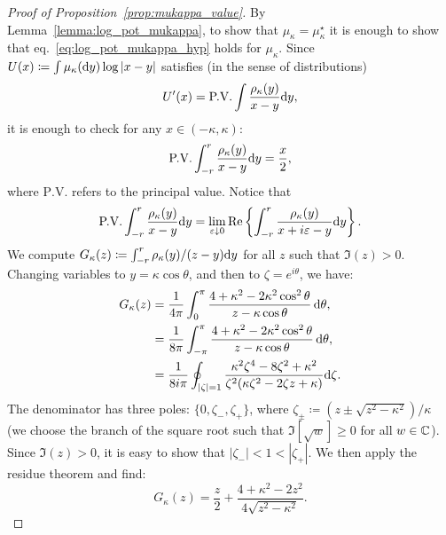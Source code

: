 \begin{proof}[Proof of Proposition~\ref{prop:mukappa_value}] 
    By Lemma~\ref{lemma:log_pot_mukappa}, to show that $\mu_\kappa = \mu_\kappa^\star$ it is enough to show that eq.~\eqref{eq:log_pot_mukappa_hyp} 
    holds for $\mu_\kappa$. 
    Since $U(x) \coloneqq \int \mu_\kappa(\mathrm{d} y) \log |x-y|$ satisfies (in the sense of distributions)
    \begin{equation*}
        U'(x) = \textrm{P.V.} \int \frac{\rho_\kappa(y)}{x-y} \mathrm{d} y,
    \end{equation*}
    it is enough to check for any $x \in (-\kappa,\kappa)$:
    \begin{equation}\label{eq:to_show_rhokappa}
        \textrm{P.V.}\int_{-r}^r \frac{\rho_\kappa(y)}{x-y} \mathrm{d} y = \frac{x}{2}, 
    \end{equation}
    where $\textrm{P.V.}$ refers to the principal value. 
    Notice that
    \begin{equation*}
        \textrm{P.V.}\int_{-r}^r \frac{\rho_\kappa(y)}{x-y} \mathrm{d} y = \lim_{\varepsilon \downarrow 0} \mathrm{Re}\left\{\int_{-r}^r \frac{\rho_\kappa(y)}{x+i\varepsilon-y} \mathrm{d} y\right\}.
    \end{equation*}
    We compute $G_\kappa(z) \coloneqq \int_{-r}^r \rho_\kappa(y)/(z-y) \mathrm{d} y$ for all $z$ such that $\Im(z) > 0$.
    Changing variables to $y = \kappa \cos \theta$, and then to $\zeta = e^{i \theta}$, we have:
    \begin{align*}
        G_\kappa(z) &= \frac{1}{4\pi} \int_0^\pi \frac{4+\kappa^2 -2 \kappa^2 \cos^2 \theta}{z - \kappa \cos \theta} \, \mathrm{d} \theta, \\ 
        &= \frac{1}{8\pi} \int_{-\pi}^\pi \frac{4+\kappa^2 -2 \kappa^2 \cos^2 \theta}{z - \kappa \cos \theta} \, \mathrm{d} \theta, \\
        &= \frac{1}{8 i\pi} \oint_{|\zeta| = 1} \frac{\kappa^2 \zeta^4 - 8 \zeta^2 + \kappa^2}{\zeta^2(\kappa\zeta^2 -2 \zeta z + \kappa)} \mathrm{d} \zeta.
    \end{align*}
    The denominator has three poles: $\{0, \zeta_-, \zeta_+\}$, where $\zeta_{\pm} \coloneqq (z \pm \sqrt{z^2-\kappa^2})/\kappa$ (we choose the branch of the square root such that $\Im[\sqrt{w}] \geq 0$ for all $w \in \mathbb{C}$).
    Since $\Im(z) > 0$, it is easy to show that $|\zeta_-| < 1 < |\zeta_+|$.
    We then apply the residue theorem and find:
    \begin{equation}\label{G_rhokappa}
        G_\kappa(z) = \frac{z}{2} + \frac{4+\kappa^2-2z^2}{4\sqrt{z^2-\kappa^2}}.
    \end{equation}

\end{proof}
